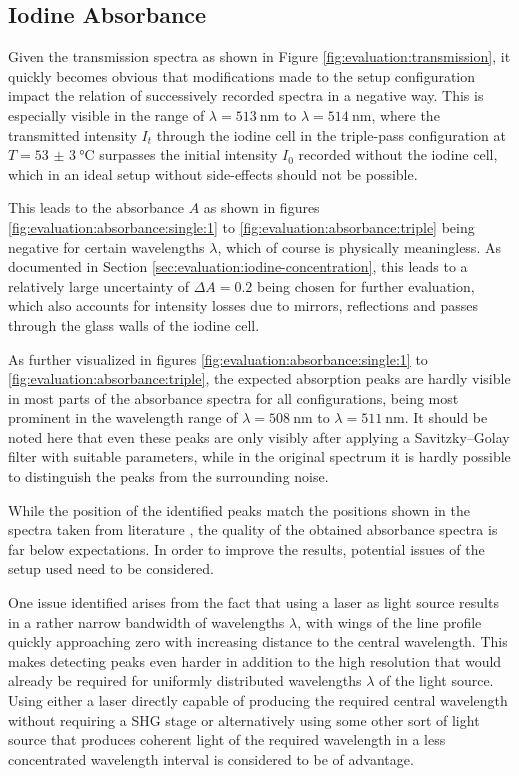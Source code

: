 \subsection{Iodine Absorbance}
\label{sec:discussion:iodine-absorbance}

Given the transmission spectra as shown in Figure \ref{fig:evaluation:transmission}, it quickly becomes obvious that modifications made to the setup configuration impact the relation of successively recorded spectra in a negative way. This is especially visible in the range of $\lambda = \SI{513}{\nm}$ to $\lambda = \SI{514}{\nm}$, where the transmitted intensity $I_t$ through the iodine cell in the triple-pass configuration at $T = \SI{53(3)}{\celsius}$ surpasses the initial intensity $I_0$ recorded without the iodine cell, which in an ideal setup without side-effects should not be possible.

This leads to the absorbance $A$ as shown in figures \ref{fig:evaluation:absorbance:single:1} to \ref{fig:evaluation:absorbance:triple} being negative for certain wavelengths $\lambda$, which of course is physically meaningless. As documented in Section \ref{sec:evaluation:iodine-concentration}, this leads to a relatively large uncertainty of $\Delta A = 0.2$ being chosen for further evaluation, which also accounts for intensity losses due to mirrors, reflections and passes through the glass walls of the iodine cell.

As further visualized in figures \ref{fig:evaluation:absorbance:single:1} to \ref{fig:evaluation:absorbance:triple}, the expected absorption peaks are hardly visible in most parts of the absorbance spectra for all configurations, being most prominent in the wavelength range of $\lambda = \SI{508}{\nm}$ to $\lambda = \SI{511}{\nm}$. It should be noted here that even these peaks are only visibly after applying a Savitzky–Golay filter with suitable parameters, while in the original spectrum it is hardly possible to distinguish the peaks from the surrounding noise.

While the position of the identified peaks match the positions shown in the spectra taken from literature \cite{Iodine}, the quality of the obtained absorbance spectra is far below expectations. In order to improve the results, potential issues of the setup used need to be considered.

One issue identified arises from the fact that using a laser as light source results in a rather narrow bandwidth of wavelengths $\lambda$, with wings of the line profile quickly approaching zero with increasing distance to the central wavelength. This makes detecting peaks even harder in addition to the high resolution that would already be required for uniformly distributed wavelengths $\lambda$ of the light source. Using either a laser directly capable of producing the required central wavelength without requiring a SHG stage or alternatively using some other sort of light source that produces coherent light of the required wavelength in a less concentrated wavelength interval is considered to be of advantage.

